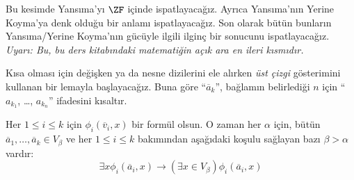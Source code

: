 


Bu kesimde Yansıma'yı $\ZF$ içinde ispatlayacağız. Ayrıca Yansıma'nın Yerine
Koyma'ya denk olduğu bir anlamı ispatlayacağız. Son olarak bütün bunların
Yansıma/Yerine Koyma'nın gücüyle ilgili ilginç bir sonucunu ispatlayacağız.
\emph{Uyarı: Bu, bu ders kitabındaki matematiğin açık ara en ileri
kısmıdır.}

Kısa olması için değişken ya da nesne dizilerini ele alırken \emph{üst çizgi}
gösterimini kullanan bir lemayla başlayacağız. Buna göre
``$\overline{a}_k$'', bağlamın belirlediği $n$ için ``$a_{k_1}$, \dots,
$a_{k_n}$'' ifadesini kısaltır.

\begin{lem}
Her $1 \leq i \leq k$ için $\phi_i(\overline{v}_i, x)$ bir formül olsun. O
zaman her $\alpha$ için, bütün $\overline{a}_1, \ldots,
\overline{a}_k \in V_\beta$ ve her $1 \leq i \leq k$ bakımından aşağıdaki
koşulu sağlayan bazı $\beta > \alpha$ vardır:
\[
	\exists x\phi_i(\overline{a}_i, x) \rightarrow (\exists x \in V_\beta) \phi_i(\overline{a}_i, x)
\]
\end{lem}

